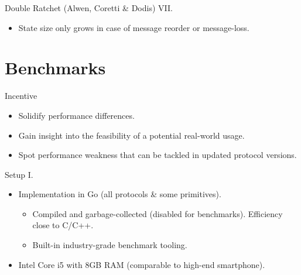 \documentclass{beamer}
\begin{document}
\begin{frame}{Double Ratchet (Alwen, Coretti \& Dodis) VII.}
  \scriptsize
   \begin{minipage}[h]{0.49\textwidth}
      \begin{figure}[h]
        \centering
        \setlength{\fboxsep}{10pt}
        \scalebox{0.7}{%
        \fbox{%
          
        }
      }
    \end{figure}
    \end{minipage}
   \begin{minipage}[h]{0.49\textwidth}
      \begin{itemize}
      \item State size only grows in case of message reorder or message-loss.
      \end{itemize}
  \end{minipage}
\end{frame}

\section{Benchmarks}
\label{sec:benchmarks}

\begin{frame}{Incentive}
  \begin{itemize}
  \item Solidify performance differences.
  \item Gain insight into the feasibility of a potential real-world usage.
  \item Spot performance weakness that can be tackled in updated protocol
    versions.
  \end{itemize}
\end{frame}

\begin{frame}{Setup I.}
  \begin{itemize}
  \item Implementation in Go (all protocols \& some primitives).
    \begin{itemize}
    \item Compiled and garbage-collected (disabled for benchmarks).
      Efficiency close to C/C++.
    \item Built-in industry-grade benchmark tooling.
    \end{itemize}
  \item Intel Core i5 with 8GB RAM (comparable to high-end smartphone).
  \end{itemize}
\end{frame}
\end{document}
